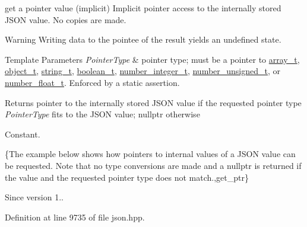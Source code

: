 get a pointer value (implicit) Implicit pointer access to the internally stored J\+S\+ON value. No copies are made.

\begin{DoxyWarning}{Warning}
Writing data to the pointee of the result yields an undefined state.
\end{DoxyWarning}

\begin{DoxyTemplParams}{Template Parameters}
{\em Pointer\+Type} & pointer type; must be a pointer to \hyperlink{classnlohmann_1_1basic__json_a4c409f1b6d9caf3412c78af9a5883fed}{array\+\_\+t}, \hyperlink{classnlohmann_1_1basic__json_a3cdea044cc3ecba1c4f9874a89daf6e4}{object\+\_\+t}, \hyperlink{classnlohmann_1_1basic__json_a61f8566a1a85a424c7266fb531dca005}{string\+\_\+t}, \hyperlink{classnlohmann_1_1basic__json_a4c919102a9b4fe0d588af64801436082}{boolean\+\_\+t}, \hyperlink{classnlohmann_1_1basic__json_a98e611d67b7bd75307de99c9358ab2dc}{number\+\_\+integer\+\_\+t}, \hyperlink{classnlohmann_1_1basic__json_ab906e29b5d83ac162e823ada2156b989}{number\+\_\+unsigned\+\_\+t}, or \hyperlink{classnlohmann_1_1basic__json_a88d6103cb3620410b35200ee8e313d97}{number\+\_\+float\+\_\+t}. Enforced by a static assertion.\\
\hline
\end{DoxyTemplParams}
\begin{DoxyReturn}{Returns}
pointer to the internally stored J\+S\+ON value if the requested pointer type {\itshape Pointer\+Type} fits to the J\+S\+ON value; {\ttfamily nullptr} otherwise
\end{DoxyReturn}
Constant.

\{The example below shows how pointers to internal values of a J\+S\+ON value can be requested. Note that no type conversions are made and a {\ttfamily nullptr} is returned if the value and the requested pointer type does not match.,get\+\_\+ptr\}

\begin{DoxySince}{Since}
version 1.. 
\end{DoxySince}


Definition at line 9735 of file json.\+hpp.

